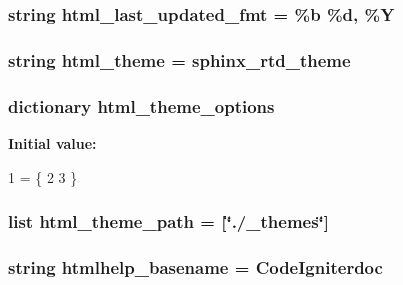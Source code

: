\subsubsection[{html\+\_\+last\+\_\+updated\+\_\+fmt}]{\setlength{\rightskip}{0pt plus 5cm}string html\+\_\+last\+\_\+updated\+\_\+fmt = \textquotesingle{}\%{\bf b} \%{\bf d}, \%Y\textquotesingle{}}\label{namespaceconf_a14f49a7c55b2b5db78ffa82dc8a46648}
\hypertarget{namespaceconf_ae3cdb5291b613a54e31ca9520cddb940}{}
\subsubsection[{html\+\_\+theme}]{\setlength{\rightskip}{0pt plus 5cm}string html\+\_\+theme = \textquotesingle{}sphinx\+\_\+rtd\+\_\+theme\textquotesingle{}}\label{namespaceconf_ae3cdb5291b613a54e31ca9520cddb940}
\hypertarget{namespaceconf_abff8d0724bf3d78779f98fa828f1e1fe}{}
\subsubsection[{html\+\_\+theme\+\_\+options}]{\setlength{\rightskip}{0pt plus 5cm}dictionary html\+\_\+theme\+\_\+options}\label{namespaceconf_abff8d0724bf3d78779f98fa828f1e1fe}
{\bfseries Initial value\+:}
\begin{DoxyCode}
1 = \{
2 
3 \}
\end{DoxyCode}
\hypertarget{namespaceconf_ab3355566e70150ea4456b3249ce8fd24}{}
\subsubsection[{html\+\_\+theme\+\_\+path}]{\setlength{\rightskip}{0pt plus 5cm}list html\+\_\+theme\+\_\+path = \mbox{[}\char`\"{}./\+\_\+themes\char`\"{}\mbox{]}}\label{namespaceconf_ab3355566e70150ea4456b3249ce8fd24}
\hypertarget{namespaceconf_a75a82d2191ce50cef1a4b6522da3c148}{}
\subsubsection[{htmlhelp\+\_\+basename}]{\setlength{\rightskip}{0pt plus 5cm}string htmlhelp\+\_\+basename = \textquotesingle{}Code\+Igniterdoc\textquotesingle{}}\label{namespaceconf_a75a82d2191ce50cef1a4b6522da3c148}
\hypertarget{namespaceconf_a19ce49f2838fb86624dc2d34e023baca}{}
